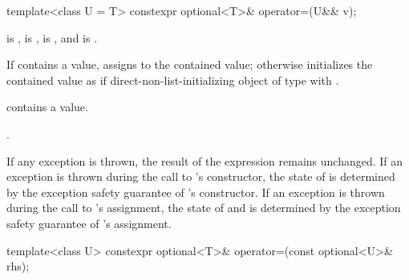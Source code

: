 %
\begin{itemdecl}
template<class U = T> constexpr optional<T>& operator=(U&& v);
\end{itemdecl}

\begin{itemdescr}
\pnum
\constraints
{} is ,
 is ,
 is , and
 is .

\pnum
\effects
If  contains a value, assigns  to the contained value; otherwise initializes the contained value as if direct-non-list-initializing object of type  with .

\pnum
\ensures
{} contains a value.

\pnum
\returns
{}.

\pnum
\remarks
If any exception is thrown, the result of the expression  remains unchanged. If an exception is thrown during the call to 's constructor, the state of  is determined by the exception safety guarantee of 's constructor. If an exception is thrown during the call to 's assignment, the state of  and  is determined by the exception safety guarantee of 's assignment.
\end{itemdescr}

%
\begin{itemdecl}
template<class U> constexpr optional<T>& operator=(const optional<U>& rhs);
\end{itemdecl}

